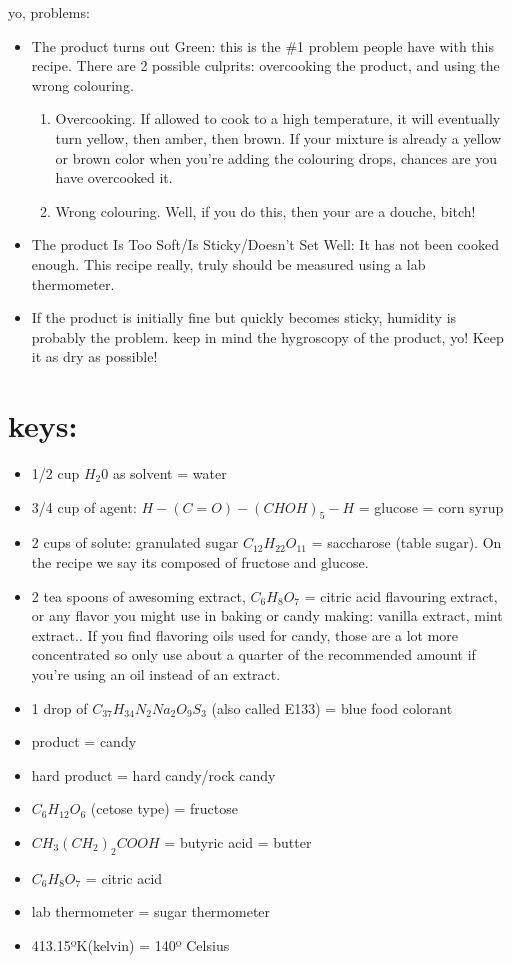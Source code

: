 \documentclass[a4paper,10pt]{article}
\begin{document}
yo, problems:
\begin{itemize}
 \item The product turns out Green: this is the \#1 problem people have with this
  recipe. There are 2 possible culprits: overcooking the product, and using the
  wrong colouring. 
  \begin{enumerate}
   \item Overcooking.  If allowed to cook to a high temperature, it
  will eventually turn yellow, then amber, then brown. If your mixture is already
  a yellow or brown color when you’re adding the colouring drops, chances are you
  have overcooked it. 
  \item  Wrong colouring. Well, if you do this, then your are a
  douche, bitch!
  \end{enumerate}

  \item The product Is Too Soft/Is Sticky/Doesn’t Set Well: It has not been cooked
enough. This recipe really, truly should be measured using a lab thermometer.
  \item If the product is initially fine but quickly becomes sticky, humidity is
probably the problem. keep in mind the hygroscopy of the product, yo! Keep it as
dry as possible!
\end{itemize}
\normalfont

\newpage
\section*{keys:} 
\begin{itemize}  
    \item 1/2 cup $H_{2}0$ as solvent = water  
    \item 3/4 cup of agent: $H-(C=O)-(CHOH)_{5}-H$ = glucose = corn syrup  
    \item 2 cups of solute:  granulated sugar $C_{12}H_{22}O_{11}$ = saccharose (table sugar). On the recipe we
    say its composed of fructose and glucose.  
    \item 2 tea spoons of awesoming
    extract, $C_{6}H_{8}O_{7}$ = citric acid flavouring extract, or any flavor you might use in
    baking or candy making: vanilla extract, mint extract.. If you find flavoring
    oils used for candy, those are a lot more concentrated so only use about a
    quarter of the recommended amount if you’re using an oil instead of an extract.
    \item 1 drop of $C_{37}H_{34}N_{2}Na_{2}O_{9}S_{3}$ (also called E133) = blue food colorant  
    \item product = candy  
    \item hard product = hard candy/rock candy  
    \item $C_{6}H_{12}O_{6}$ (cetose type) = fructose  
    \item $CH_{3}(CH_{2})_{2}COOH$ = butyric acid = butter  
    \item $C_{6}H_{8}O_{7}$ = citric acid  
    \item lab thermometer = sugar thermometer 
    \item 413.15ºK(kelvin) = 140º Celsius 
\end{itemize}
\end{document}
